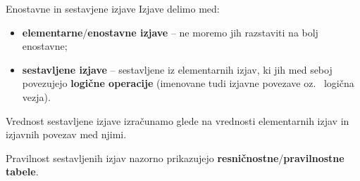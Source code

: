         \begin{frame}
            \begin{alertblock}{Enostavne in sestavjene izjave}
                Izjave delimo med:
                \begin{itemize}
                    \item \textbf{elementarne}/\textbf{enostavne izjave} -- ne moremo 
                        jih razstaviti na bolj enostavne;
                    \item \textbf{sestavljene izjave} -- sestavljene iz elementarnih izjav, 
                        ki jih med seboj povezujejo \textbf{logične operacije} (imenovane 
                        tudi izjavne povezave oz.~ logična vezja).
                \end{itemize}
            \end{alertblock}

            \begin{alertblock}{}
                Vrednost sestavljene izjave izračunamo glede na vrednosti elementarnih 
                izjav in izjavnih povezav med njimi.
            \end{alertblock}
            \begin{alertblock}{}
                Pravilnost sestavljenih izjav nazorno prikazujejo 
                \textbf{resničnostne}/\textbf{pravilnostne tabele}.
            \end{alertblock}

        \end{frame}

